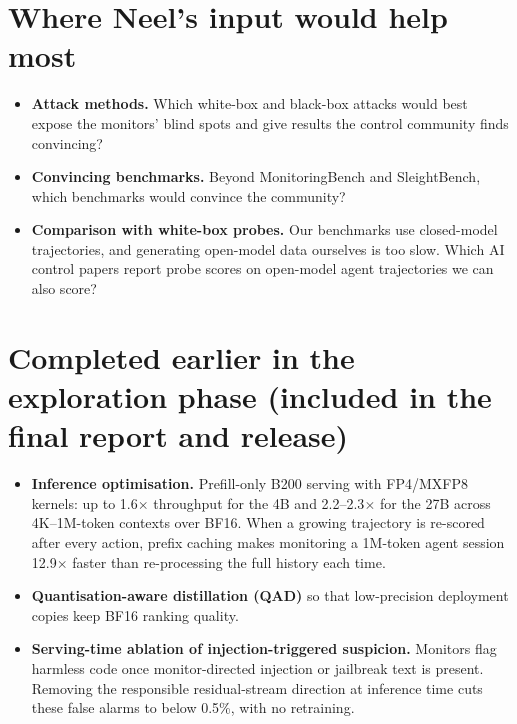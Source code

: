 \documentclass[10pt]{article}
\begin{document}
\section{Where Neel's input would help most}
\begin{itemize}
  \item \textbf{Attack methods.} Which white-box and black-box attacks would best expose the monitors' blind
        spots and give results the control community finds convincing?
  \item \textbf{Convincing benchmarks.} Beyond MonitoringBench and SleightBench, which benchmarks would convince the community?
  \item \textbf{Comparison with white-box probes.} Our benchmarks use closed-model trajectories, and generating open-model
        data ourselves is too slow. Which AI control papers report probe scores on open-model agent trajectories we can also score?
\end{itemize}

\section{Completed earlier in the exploration phase (included in the final report and release)}
\begin{itemize}
  \item \textbf{Inference optimisation.} Prefill-only B200 serving with FP4/MXFP8 kernels: up to 1.6$\times$ throughput
        for the 4B and 2.2--2.3$\times$ for the 27B across 4K--1M-token contexts over BF16. When a growing
        trajectory is re-scored after every action, prefix caching makes monitoring a 1M-token agent session
        12.9$\times$ faster than re-processing the full history each time.
  \item \textbf{Quantisation-aware distillation (QAD)} so that low-precision deployment copies keep BF16 ranking quality.
  \item \textbf{Serving-time ablation of injection-triggered suspicion.} Monitors flag harmless code once
        monitor-directed injection or jailbreak text is present. Removing the responsible residual-stream direction at
        inference time cuts these false alarms to below 0.5\%, with no retraining.
\end{itemize}
\end{document}
